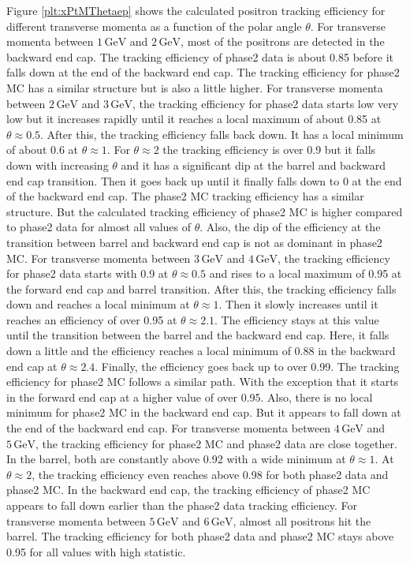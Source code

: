 \documentclass[a4paper,11pt,twosided,final,german,openbib,pdftex,listof=totoc,bibliography=totoc]{scrbook}
\begin{document}
Figure \ref{plt:xPtMThetaep} shows the calculated positron tracking efficiency for different transverse momenta as a function of the polar angle $\theta$. For transverse momenta between $1\,\textrm{GeV}$ and $2\,\textrm{GeV}$, most of the positrons are detected in the backward end cap. The tracking efficiency of phase2 data is about 0.85 before it falls down at the end of the backward end cap. The tracking efficiency for phase2 MC has a similar structure but is also a little higher.
For transverse momenta between $2\,\textrm{GeV}$ and $3\,\textrm{GeV}$, the tracking efficiency for phase2 data starts low very low but it increases rapidly until it reaches a local maximum of about 0.85 at $\theta \approx 0.5$. After this, the tracking efficiency falls back down. It has  a local minimum of about 0.6 at $\theta \approx 1$. For $\theta \approx 2$ the tracking efficiency is over 0.9 but it falls down with increasing $\theta$ and it has a significant dip at the barrel and backward end cap transition. Then it goes back up until it finally falls down to 0 at the end of the backward end cap. The phase2 MC tracking efficiency has a similar structure. But the calculated tracking efficiency of phase2 MC is higher compared to phase2 data for almost all values of $\theta$. Also, the dip of the efficiency at the transition between barrel and backward end cap is not as dominant in phase2 MC.
For transverse momenta between $3\,\textrm{GeV}$ and $4\,\textrm{GeV}$, the tracking efficiency for phase2 data starts with 0.9 at $\theta \approx 0.5$ and rises to a local maximum of 0.95 at the forward end cap and barrel transition. After this, the tracking efficiency falls down and reaches a local minimum at $\theta \approx 1$. Then it slowly increases until it reaches an efficiency of over 0.95 at $\theta \approx 2.1$. The efficiency stays at this value until the transition between the barrel and the backward end cap. Here, it falls down a little and the efficiency reaches a local minimum of 0.88 in the backward end cap at $\theta \approx 2.4$. Finally, the efficiency goes back up to over 0.99. The tracking efficiency for phase2 MC follows a similar path. With the exception that it starts in the forward end cap at a higher value of over 0.95. Also, there is no local minimum for phase2 MC in the backward end cap. But it appears to fall down at the end of the backward end cap.
For transverse momenta between $4\,\textrm{GeV}$  and $5\,\textrm{GeV}$, the tracking efficiency for phase2 MC and phase2 data are close together. In the barrel, both are constantly above 0.92 with a wide minimum at $\theta \approx 1$. At $\theta \approx 2$, the tracking efficiency even reaches above 0.98 for both phase2 data and phase2 MC. In the backward end cap, the tracking efficiency of phase2 MC appears to fall down earlier than the phase2 data tracking efficiency.
For transverse momenta between $5\,\textrm{GeV}$ and $6\,\textrm{GeV}$, almost all positrons hit the barrel. The tracking efficiency for both phase2 data and phase2 MC stays above 0.95 for all values with high statistic.
\end{document}
